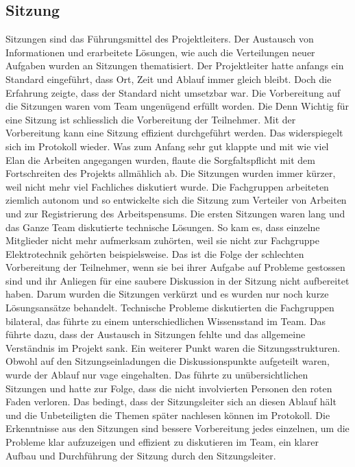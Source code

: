 \subsection{Sitzung}
Sitzungen sind das Führungsmittel des Projektleiters. Der Austausch von Informationen und erarbeitete Lösungen, wie auch die Verteilungen neuer Aufgaben wurden an Sitzungen thematisiert. Der Projektleiter hatte anfangs ein Standard eingeführt, dass Ort, Zeit und Ablauf immer gleich bleibt. Doch die Erfahrung zeigte, dass der Standard nicht umsetzbar war. Die Vorbereitung auf die Sitzungen waren vom Team ungenügend erfüllt worden. Die Denn Wichtig für eine Sitzung ist schliesslich die Vorbereitung der Teilnehmer. Mit der Vorbereitung kann eine Sitzung effizient durchgeführt werden. Das widerspiegelt sich im Protokoll wieder. Was zum Anfang sehr gut klappte und mit wie viel Elan die Arbeiten angegangen wurden, flaute die Sorgfaltspflicht mit dem Fortschreiten des Projekts allmählich ab. Die Sitzungen wurden immer kürzer, weil nicht mehr viel Fachliches diskutiert wurde. Die Fachgruppen arbeiteten ziemlich autonom und so entwickelte sich die Sitzung zum Verteiler von Arbeiten und zur Registrierung des Arbeitspensums. Die ersten Sitzungen waren lang und das Ganze Team diskutierte technische Lösungen. So kam es, dass einzelne Mitglieder nicht mehr aufmerksam zuhörten, weil sie nicht zur Fachgruppe Elektrotechnik gehörten beispielsweise. Das ist die Folge der schlechten Vorbereitung der Teilnehmer, wenn sie bei ihrer Aufgabe auf Probleme gestossen sind und ihr Anliegen für eine saubere Diskussion in der Sitzung nicht aufbereitet haben. Darum wurden die Sitzungen verkürzt und es wurden nur noch kurze Lösungsansätze behandelt. Technische Probleme diskutierten die Fachgruppen bilateral, das führte zu einem unterschiedlichen Wissensstand im Team. Das führte dazu, dass der Austausch in Sitzungen fehlte und das allgemeine Verständnis im Projekt sank. Ein weiterer Punkt waren die Sitzungsstrukturen. Obwohl auf den Sitzungseinladungen die Diskussionspunkte aufgeteilt waren, wurde der Ablauf nur vage eingehalten. Das führte zu unübersichtlichen Sitzungen und hatte zur Folge, dass die nicht involvierten Personen den roten Faden verloren. Das bedingt, dass der Sitzungsleiter sich an diesen Ablauf hält und die Unbeteiligten die Themen später nachlesen können im Protokoll.
Die Erkenntnisse aus den Sitzungen sind bessere Vorbereitung jedes einzelnen, um die Probleme klar aufzuzeigen und effizient zu diskutieren im Team, ein klarer Aufbau und Durchführung der Sitzung durch den Sitzungsleiter.
